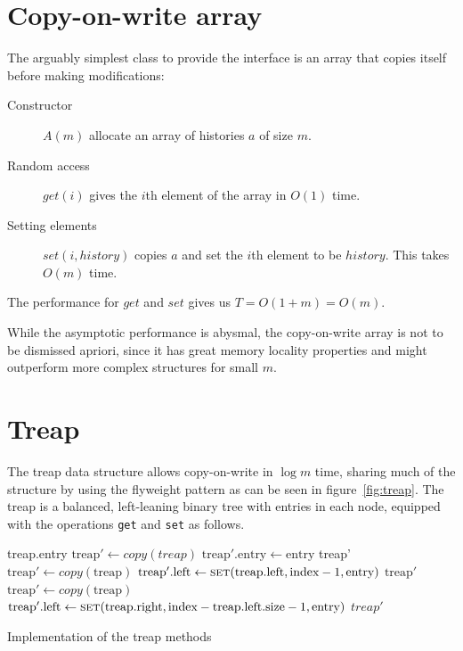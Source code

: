 \documentclass[11pt]{Thesis}
\theoremstyle{definition}
\newcommand{\Figref}[1]{figure~\ref{fig:#1}}
\begin{document}
\section{Copy-on-write array}
The arguably simplest class to provide the interface is an array that copies 
itself before making modifications:

\begin{description}
  \item[Constructor] $A(m)$ allocate an array of histories $a$ of size $m$.
  \item[Random access] $get(i)$ gives the $i$th element of the array in $O(1)$ 
    time.
  \item[Setting elements] $set(i, history)$ copies $a$ and set the $i$th 
    element to be $history$. This takes $O(m)$ time.
\end{description}

The performance for $get$ and $set$ gives us $T=O(1 + m) = O(m)$.

While the asymptotic performance is abysmal, the copy-on-write array is not
to be dismissed apriori, since it has great memory locality properties and 
might outperform more complex structures for small $m$.

\section{Treap}
The treap data structure allows copy-on-write in $\log m$ time, sharing
much of the structure by using the flyweight pattern as can be seen in
\Figref{treap}. The treap is a balanced, left-leaning binary tree with entries
in each node, equipped with the operations \texttt{get} and \texttt{set} as follows.

\begin{algorithm*}
\begin{algorithmic}[1]
		\State \Return treap.entry
		\State \Return {}
	\Else
		\State \Return {}
	\EndIf
\EndFunction
\Statex
{}
		\State $\text{treap}'\gets copy(treap)$
		\State $\text{treap}'\text{.entry} \gets \text{entry}$
		\State \Return treap'
		\State $\text{treap}'\gets copy(\text{treap})$
		\State $\text{treap}'\text{.left} \gets \Call{set}{\text{treap.left}, \text{index}-1, \text{entry}}$
		\State \Return $\text{treap}'$
	\Else
		\State $\text{treap}'\gets copy(\text{treap})$
		\State $\text{treap}'\text{.left} \gets \Call{set}{\text{treap.right}, \text{index}-\text{treap.left.size}-1, \text{entry}}$
		\State \Return $treap'$
	\EndIf
\EndFunction
\end{algorithmic}
\caption{\label{alg:treap} Implementation of the treap methods}
\end{algorithm*}
\end{document}
